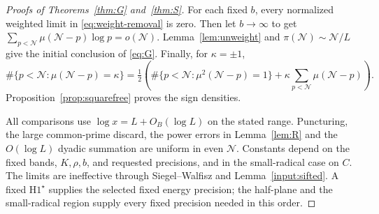\documentclass[11pt]{article}
\theoremstyle{definition}
\newcommand{\GN}{\mathcal N}
\theoremstyle{remark}
\numberwithin{equation}{section}
\begin{document}
\begin{proof}[Proofs of Theorems~\ref{thm:G} and~\ref{thm:S}]
For each fixed $b$, every normalized weighted limit in
\eqref{eq:weight-removal} is zero.
Then let $b\to\infty$ to get
$\sum_{p<\GN}\mu(\GN-p)\log p=o(\GN)$.
Lemma~\ref{lem:unweight} and $\pi(\GN)\sim\GN/L$ give the initial
conclusion of \eqref{eq:G}.
Finally, for $\kappa=\pm1$,
\begin{equation}\label{eq:mu-sign-identity}
 \#\{p<\GN:\mu(\GN-p)=\kappa\}
 =\tfrac12\left(\#\{p<\GN:\mu^2(\GN-p)=1\}
                 +\kappa\sum_{p<\GN}\mu(\GN-p)\right).
\end{equation}
Proposition~\ref{prop:squarefree} proves the sign densities.

All comparisons use $\log x=L+O_B(\log L)$ on the stated range.
Puncturing, the large common-prime discard, the power errors in
Lemma~\ref{lem:R} and the $O(\log L)$ dyadic summation are uniform
in even $\GN$. Constants depend on the fixed bands, $K,\rho,b$,
and requested precisions, and in the small-radical case on $C$.
The limits are ineffective through Siegel--Walfisz and
Lemma~\ref{input:sifted}. A fixed $\mathrm H1^\star$ supplies the selected
fixed energy precision; the half-plane and the small-radical region
supply every fixed precision needed in this order.
\end{proof}
\end{document}
